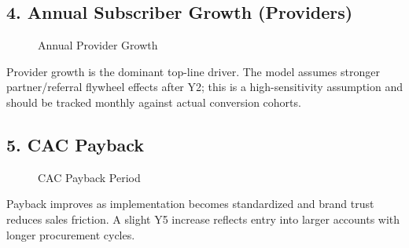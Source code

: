 \documentclass[11pt]{article}
\begin{document}
\subsection*{4. Annual Subscriber Growth (Providers)}
\begin{figure}[h]
\centering
{}
\caption{Annual Provider Growth}
\end{figure}

Provider growth is the dominant top-line driver. The model assumes stronger partner/referral flywheel effects after Y2; this is a high-sensitivity assumption and should be tracked monthly against actual conversion cohorts.

\subsection*{5. CAC Payback}
\begin{figure}[h]
\centering
{}
\caption{CAC Payback Period}
\end{figure}

Payback improves as implementation becomes standardized and brand trust reduces sales friction. A slight Y5 increase reflects entry into larger accounts with longer procurement cycles.
\end{document}
